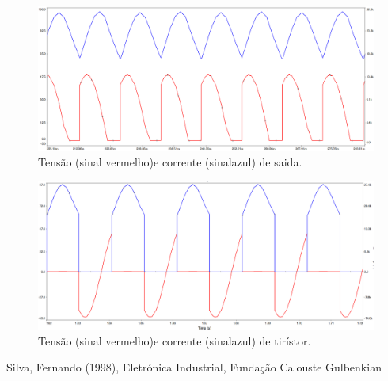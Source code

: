 \documentclass[a4paper,11pt]{article}
\numberwithin{equation}{section}
\begin{document}
\pagebreak
\begin{figure}[h]
	\centering
	\includegraphics[keepaspectratio=true, scale=0.4]{img/circuito10}
	\caption{Tensão (sinal vermelho)e corrente (sinalazul) de saida.}
	\label{fig:circuit_12}
	\vspace{-0.8em}
\end{figure}
\vspace{15mm}
\begin{figure}[h]
	\centering
	\includegraphics[keepaspectratio=true, scale=0.4]{img/circuito11}
	\caption{Tensão (sinal vermelho)e corrente (sinalazul) de tirístor.}
	\label{fig:circuit_13}
	\vspace{-0.8em}
\end{figure}


\begin{thebibliography}{2}
	

	
	Silva, Fernando (1998), Eletrónica Industrial, Fundação Calouste Gulbenkian
	
\end{thebibliography}


\pagebreak
\end{document}
